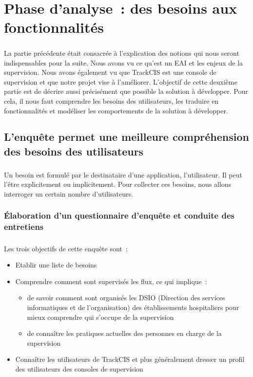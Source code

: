 \chapter{Phase d'analyse~: des besoins aux fonctionnalités}
	\paragraph{}
	La partie précédente était consacrée à l'explication des notions qui nous
	seront indispensables pour la suite. Nous avons vu
	ce qu'est un EAI et les enjeux de la supervision. Nous avons également vu que
	TrackCIS est une console de supervision et que notre projet vise à l'améliorer.
	L'objectif de cette deuxième partie est de décrire aussi précisément que
	possible la solution à développer. Pour cela, il nous faut comprendre les
	besoins des utilisateurs, les traduire en
	fonctionnalités et modéliser les comportements de la solution à développer.
	
	\section{L'enquête permet une meilleure compréhension des besoins des utilisateurs}
		\paragraph{}
		Un besoin est formulé par le destinataire d'une application, l'utilisateur. Il
		peut l'être explicitement ou implicitement. Pour collecter ces besoins, nous
		allons interroger un certain nombre d'utilisateurs.
		
		\subsection{Élaboration d'un questionnaire d'enquête et conduite des entretiens}
			\paragraph{}%
			Les trois objectifs de cette enquête sont~:
			\begin{itemize}
			  \item Etablir une liste de besoins
			  \item Comprendre comment sont supervisés les flux, ce qui implique~:
			  \begin{itemize}
			    \item de savoir comment sont
			  	organisés les DSIO (Direction des services informatiques et de
			  	l’organisation) des établissements hospitaliers pour mieux comprendre qui
			  	s'occupe de la supervision
			  	\item de connaître les pratiques actuelles des personnes en charge de la
			  	supervision
			  	\end{itemize}
			  \item Connaître les utilisateurs de TrackCIS et plus généralement dresser
			  un profil des utilisateurs des consoles de supervision
			\end{itemize}
			
